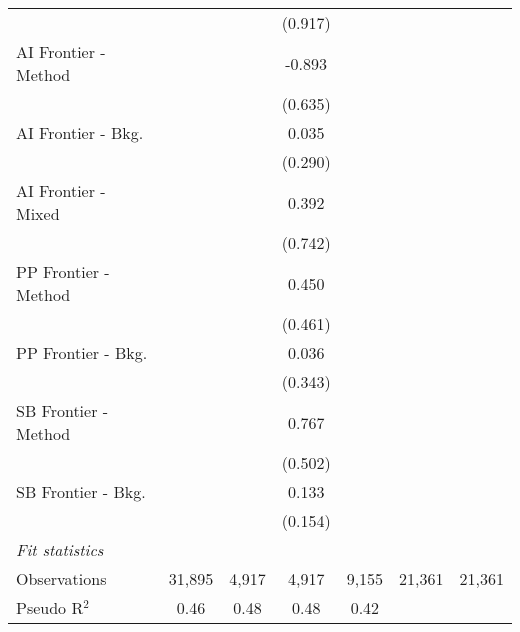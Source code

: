 \begin{tabular}{lcccccc}
                        &             &             & (0.917) &         &        &   \\   
   AI Frontier - Method &             &             & -0.893  &         &        &   \\   
                        &             &             & (0.635) &         &        &   \\   
   AI Frontier - Bkg.   &             &             & 0.035   &         &        &   \\   
                        &             &             & (0.290) &         &        &   \\   
   AI Frontier - Mixed  &             &             & 0.392   &         &        &   \\   
                        &             &             & (0.742) &         &        &   \\   
   PP Frontier - Method &             &             & 0.450   &         &        &   \\   
                        &             &             & (0.461) &         &        &   \\   
   PP Frontier - Bkg.   &             &             & 0.036   &         &        &   \\   
                        &             &             & (0.343) &         &        &   \\   
   SB Frontier - Method &             &             & 0.767   &         &        &   \\   
                        &             &             & (0.502) &         &        &   \\   
   SB Frontier - Bkg.   &             &             & 0.133   &         &        &   \\   
                        &             &             & (0.154) &         &        &   \\   
   \midrule
   \emph{Fit statistics}\\
   Observations         & 31,895      & 4,917       & 4,917   & 9,155   & 21,361 & 21,361\\  
   Pseudo R$^2$         & 0.46        & 0.48        & 0.48    & 0.42    &        & \\  
   

\end{tabular}
